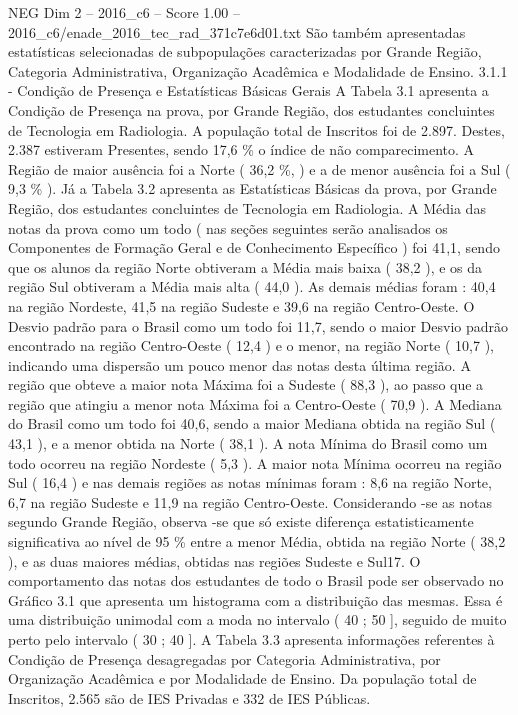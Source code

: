 \begin{textsample}{NEG Dim 2 – 2016\_c6 – Score 1.00 – 2016\_c6/enade\_2016\_tec\_rad\_371c7e6d01.txt}
São também apresentadas estatísticas selecionadas de subpopulações caracterizadas por Grande Região, Categoria Administrativa, Organização Acadêmica e Modalidade de Ensino. 3.1.1 - Condição de Presença e Estatísticas Básicas Gerais A Tabela 3.1 apresenta a Condição de Presença na prova, por Grande Região, dos estudantes concluintes de Tecnologia em Radiologia.
A população total de Inscritos foi de 2.897.
Destes, 2.387 estiveram Presentes, sendo 17,6 \% o índice de não comparecimento.
A Região de maior ausência foi a Norte ( 36,2 \%, ) e a de menor ausência foi a Sul ( 9,3 \% ).
Já a Tabela 3.2 apresenta as Estatísticas Básicas da prova, por Grande Região, dos estudantes concluintes de Tecnologia em Radiologia.
A Média das notas da prova como um todo ( nas seções seguintes serão analisados os Componentes de Formação Geral e de Conhecimento Específico ) foi 41,1, sendo que os alunos da região Norte obtiveram a Média mais baixa ( 38,2 ), e os da região Sul obtiveram a Média mais alta ( 44,0 ).
As demais médias foram : 40,4 na região Nordeste, 41,5 na região Sudeste e 39,6 na região Centro-Oeste.
O Desvio padrão para o Brasil como um todo foi 11,7, sendo o maior Desvio padrão encontrado na região Centro-Oeste ( 12,4 ) e o menor, na região Norte ( 10,7 ), indicando uma dispersão um pouco menor das notas desta última região.
A região que obteve a maior nota Máxima foi a Sudeste ( 88,3 ), ao passo que a região que atingiu a menor nota Máxima foi a Centro-Oeste ( 70,9 ).
A Mediana do Brasil como um todo foi 40,6, sendo a maior Mediana obtida na região Sul ( 43,1 ), e a menor obtida na Norte ( 38,1 ).
A nota Mínima do Brasil como um todo ocorreu na região Nordeste ( 5,3 ).
A maior nota Mínima ocorreu na região Sul ( 16,4 ) e nas demais regiões as notas mínimas foram : 8,6 na região Norte, 6,7 na região Sudeste e 11,9 na região Centro-Oeste.
Considerando -se as notas segundo Grande Região, observa -se que só existe diferença estatisticamente significativa ao nível de 95 \% entre a menor Média, obtida na região Norte ( 38,2 ), e as duas maiores médias, obtidas nas regiões Sudeste e Sul17.
O comportamento das notas dos estudantes de todo o Brasil pode ser observado no Gráfico 3.1 que apresenta um histograma com a distribuição das mesmas.
Essa é uma distribuição unimodal com a moda no intervalo ( 40 ; 50 ], seguido de muito perto pelo intervalo ( 30 ; 40 ].
A Tabela 3.3 apresenta informações referentes à Condição de Presença desagregadas por Categoria Administrativa, por Organização Acadêmica e por Modalidade de Ensino.
Da população total de Inscritos, 2.565 são de IES Privadas e 332 de IES Públicas.

\end{textsample}
